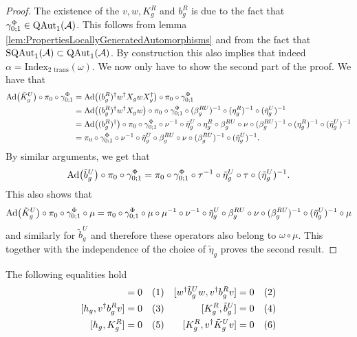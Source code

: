\documentclass[11pt,a4paper,twoside]{article}
\numberwithin{equation}{section}
\begin{document}
	\begin{proof}
		The existence of the $v,w,K_g^R$ and $b_g^R$ is due to the fact that $\gamma^\Phi_{0;1}\in \QAut{\AA}$. This follows from lemma \ref{lem:PropertiesLocallyGeneratedAutomorphisms} and from the fact that $\textrm{SQAut}_1(\AA)\subset \QAut{\AA}$. By construction this also implies that indeed $\alpha=\textrm{Index}_{\text{2 trans}}(\omega)$. We now only have to show the second part of the proof. We have that
		\begin{align}
			\Ad{\tilde{K}_g^U}\circ\pi_0\circ\gamma^\Phi_{0;1}&=\Ad{(b_g^R)^\dagger w^\dagger X_g w X_g^\dagger}\circ\pi_0\circ\gamma^\Phi_{0;1}\\
			&=\Ad{(b_g^R)^\dagger w^\dagger X_g w}\circ\pi_0\circ\gamma^\Phi_{0;1}\circ(\beta_g^{RU})^{-1}\circ(\eta_g^R)^{-1}\circ(\tilde{\eta}_g^U)^{-1}\\
			&=\Ad{(b_g^R)^\dagger}\circ\pi_0\circ\gamma^\Phi_{0;1}\circ\nu^{-1}\circ\tilde{\eta}_g^U\circ\eta_g^R\circ\beta_g^{RU}\circ\nu\circ(\beta_g^{RU})^{-1}\circ(\eta_g^R)^{-1}\circ(\tilde{\eta}_g^U)^{-1}\\
			&=\pi_0\circ\gamma^\Phi_{0;1}\circ\nu^{-1}\circ\tilde{\eta}_g^U\circ\beta_g^{RU}\circ\nu\circ(\beta_g^{RU})^{-1}\circ(\tilde{\eta}_g^U)^{-1}.
		\end{align}
		By similar arguments, we get that
		\begin{equation}
			\Ad{\tilde{b}_g^U}\circ\pi_0\circ\gamma^\Phi_{0;1}=\pi_0\circ\gamma^\Phi_{0;1}\circ\tau^{-1}\circ\tilde{\eta}_g^U\circ\tau\circ(\tilde{\eta}_g^U)^{-1}.
		\end{equation}
		This also shows that
		\begin{equation}
			\Ad{\tilde{K}_g^U}\circ\pi_0\circ\gamma^\Phi_{0;1}\circ\mu=\pi_0\circ\gamma^\Phi_{0;1}\circ\mu\circ\mu^{-1}\circ\nu^{-1}\circ\tilde{\eta}_g^U\circ\beta_g^{RU}\circ\nu\circ(\beta_g^{RU})^{-1}\circ(\tilde{\eta}_g^U)^{-1}\circ\mu
		\end{equation}
		and similarly for $\tilde{b}_g^U$ and therefore these operators also belong to $\omega\circ\mu$. This together with the independence of the choice of $\tilde{\eta}_g$ proves the second result.
	\end{proof}
	\begin{lemma}
		The following equalities hold
		\begin{align*}
			[h_g ,w^\dagger \tilde{b}_g^U w]&=0 \Label{eq:H^1IndexRotationInvariantCommutator1}& [w^\dagger \tilde{b}_g^U w,v^\dagger b_g^R v]&=0 \Label{eq:H^1IndexRotationInvariantCommutator4}\\
			[h_g, v^\dagger b_g^R v]&=0 \Label{eq:H^1IndexRotationInvariantCommutator2}& [K_g^R,\tilde{b}_g^U] &= 0 \Label{eq:H^1IndexRotationInvariantCommutator5}\\
			[h_g ,K_g^R]&=0 \Label{eq:H^1IndexRotationInvariantCommutator3}& [K_g^R,v^\dagger \tilde{K}^U_g v] &= 0 \Label{eq:H^1IndexRotationInvariantCommutator6}
		\end{align*}
	\end{lemma}
\end{document}
